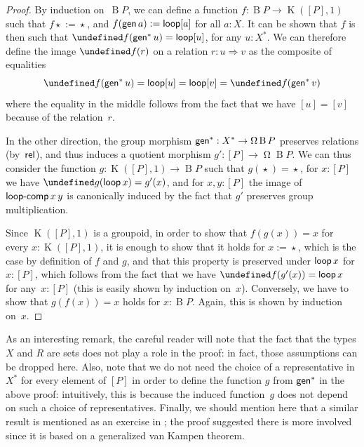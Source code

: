 \documentclass[10pt,a4paper]{amsart}
\theoremstyle{definition}
\newcommand{\freegroup}[1]{#1^*} %
\newcommand{\pgroup}[1]{[#1]} %
\newcommand{\B}{\operatorname{B}} %
\newcommand{\pt}[1]{\star_{#1}} %
\newcommand{\trunq}[2]{|#2|_{#1}} %
\newcommand{\strunq}[1]{\trunq0{#1}} %
\newcommand{\defd}{:=} %
\newcommand{\K}{\operatorname{K}} %
\newcommand{\Loop}{\operatorname{\Omega}} %
\let\cong\undefined
\newcommand{\cong}[1]{#1^=} %
\newcommand{\ap}{\cong}
\newcommand{\constructor}[1]{\operatorname{\textsf{\textup{#1}}}}
\newcommand{\cloop}{\constructor{loop}}
\newcommand{\cloopcomp}{\constructor{loop-comp}}
\newcommand{\cgen}{\constructor{gen}}
\newcommand{\crel}{\constructor{rel}}
\newcommand{\To}{\Rightarrow}
\newcommand{\TODO}[1]{\marginpar{\tiny #1}}
\begin{document}
\begin{proof}
  By induction on~$\B P$, we can define a function $f:\B P\to\K(\pgroup P,1)$ such that
  $f\pt{}\defd\pt{}$, and $f(\cgen a)\defd\cloop\pgroup a$ for all $a:X$. It can
  be shown that $f$ is then such that
  $\cong f(\freegroup\cgen u)=\cloop\pgroup u$, for any $u:\freegroup X$. We can
  therefore define the image $\cong f(r)$ on a relation $r:u\To v$ as the
  composite of equalities
  \[
    \cong f(\freegroup\cgen u)=\cloop\pgroup u=\cloop\pgroup v=\cong f(\freegroup\cgen v)
  \]
  where the equality in the middle follows from the fact that we have
  $\pgroup u=\pgroup v$ because of the relation~$r$.

  In the other direction, the group morphism $\freegroup\cgen:\freegroup{X}\to \Loop\B P$ preserves relations (by~$\crel$), and thus induces a quotient morphism $g':\pgroup P\to\Loop\B P$.
  We can thus consider the function $g:\K(\pgroup P,1)\to\B P$ such that $g(\pt{})=\pt{}$, for $x:\pgroup P$ we have $\ap g(\cloop x)=g'(x)$, and for $x,y:\pgroup P$ the image of $\cloopcomp x\,y$ is canonically induced by the fact that $g'$ preserves group multiplication.

  Since $\K(\pgroup P,1)$ is a groupoid, in order to show that $f(g(x))=x$ for every $x:\K(\pgroup P,1)$, it is enough to show that it holds for $x\defd\pt{}$, which is the case by definition of $f$ and $g$, and that this property is preserved under $\cloop x$ for $x:\pgroup P$, which follows from the fact that we have $\ap f(g'(x))=\cloop x$ for any~$x:\pgroup P$ (this is easily shown by induction on~$x$).
  Conversely, we have to show that $g(f(x))=x$ holds for $x:\B P$. Again, this is shown by induction on~$x$.
\end{proof}

\noindent
As an interesting remark, the careful reader will note that the fact that the types $X$ and $R$ are sets does not play a role in the proof: in fact, those assumptions can be dropped here.
%
Also, note that we do not need the choice of a representative in $\freegroup X$ for every element of $\pgroup P$ in order to define the function $g$ from $\freegroup\cgen$ in the above proof: intuitively, this is because the induced function~$g$ does not depend on such a choice of representatives.
%
Finally, we should mention here that a similar result is mentioned as an exercise in \cite[Example 8.7.17]{hottbook}; the proof suggested there is more involved since it is based on a generalized van Kampen theorem.
\end{document}
